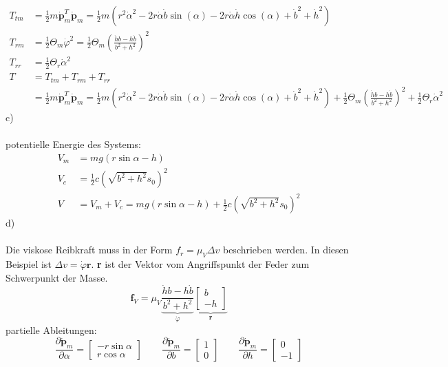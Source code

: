 \begin{align*}
	T_{tm} &= \frac{1}{2}m\dot{\textbf{p}}_m^T \dot{\textbf{p}}_m = \frac{1}{2} m \left( r^2\dot{\alpha}^2 -2r\dot{\alpha}\dot{b}\sin\left(\alpha\right) - 2r\dot{\alpha}\dot{h}\cos\left(\alpha\right) + \dot{b}^2 + \dot{h}^2\right) \\
	T_{rm} &= \frac{1}{2} \Theta_m\dot{\varphi}^2 = \frac{1}{2} \Theta_m \left( \frac{\dot{h}b - h\dot{b}}{b^2 + h^2}\right)^2 \\
	T_{rr} &= \frac{1}{2}\Theta_r\dot{\alpha}^2 \\
	T &= T_{tm} + T_{rm} + T_{rr} \\
	  &= \frac{1}{2}m\dot{\textbf{p}}_m^T \dot{\textbf{p}}_m = \frac{1}{2} m \left( r^2\dot{\alpha}^2 -2r\dot{\alpha}\dot{b}\sin\left(\alpha\right) - 2r\dot{\alpha}\dot{h}\cos\left(\alpha\right) + \dot{b}^2 + \dot{h}^2\right) 
	  + \frac{1}{2} \Theta_m \left( \frac{\dot{h}b - h\dot{b}}{b^2 + h^2}\right)^2 + \frac{1}{2}\Theta_r\dot{\alpha}^2
\end{align*}
\newpage
\noindent
c) \\ \\
potentielle Energie des Systems:
\begin{align*}
	V_m &= mg\left(r\sin\alpha - h\right) \\
	V_c &= \frac{1}{2} c \left(\sqrt{b^2 + h^2} s_0\right)^2 \\
	V &= V_m + V_c = mg\left(r\sin\alpha - h\right) + \frac{1}{2} c \left(\sqrt{b^2 + h^2} s_0\right)^2
\end{align*}
d) \\ \\
Die viskose Reibkraft muss in der Form $f_r = \mu_V \Delta v$ beschrieben werden. In diesen Beispiel ist $\Delta v = \dot{\varphi}\textbf{r}$. \textbf{r} ist der Vektor vom Angriffspunkt der Feder zum Schwerpunkt der Masse.
\[
	\textbf{f}_V = \mu_V \underbrace{\frac{\dot{h}b - h\dot{b}}{b^2 + h^2}}_{\dot{\varphi}} \underbrace{\begin{bmatrix}
	b \\ -h
	\end{bmatrix}}_{\textbf{r}}
\]
partielle Ableitungen:
\[
	\frac{\partial \dot{\textbf{p}}_m}{\partial \alpha}  = \left[ \begin{matrix}
		-r\sin\alpha \\ r\cos\alpha
	\end{matrix}\right] \qquad \frac{\partial \dot{\textbf{p}}_m}{\partial b} = \left[ \begin{matrix}
	 1 \\ 0
	\end{matrix}\right] \qquad \frac{\partial \dot{\textbf{p}}_m}{\partial h} = \left[ \begin{matrix}
	0 \\ -1
	\end{matrix}\right]
\]

